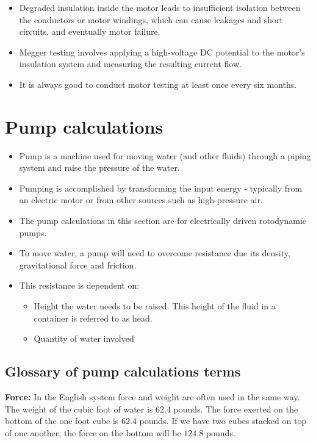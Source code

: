 \begin{itemize}
\begin{itemize}
\begin{itemize}
\begin{itemize}
\item Degraded insulation inside the motor leads to insufficient isolation between the conductors or motor windings, which can cause leakages and short circuits, and eventually motor failure.
\item Megger testing involves applying a high-voltage DC potential to the motor's insulation system and measuring the resulting current flow.  
\item It is always good to conduct motor testing at least once every six months.
\end{itemize}
\end{itemize}
\end{itemize}
\end{itemize}

\section{Pump calculations}
\begin{itemize}
\item Pump is a machine used for moving water (and other fluids) through a piping system and raise the pressure of the water.
\item Pumping is accomplished by transforming the input energy - typically from an electric motor or from other sources such as high-pressure air.
\item The pump calculations in this section are for electrically driven rotodynamic pumps.
\item To move water, a pump will need to overcome resistance due its density, gravitational force and friction.
\item This resistance is dependent on:
\begin{itemize}
\item Height the water needs to be raised.  This height of the fluid in a container is referred to as head. 
\item Quantity of water involved
\end{itemize}
\end{itemize}

\subsection{Glossary of pump calculations terms}

\textbf{Force:}  In the English system force and weight are often used in the same way. The weight of the cubic foot of water is $62.4$ pounds. The force exerted on the bottom of the one foot cube is $62.4$ pounds. If we have two cubes stacked on top of one another, the force on the bottom will be $124.8$ pounds.


